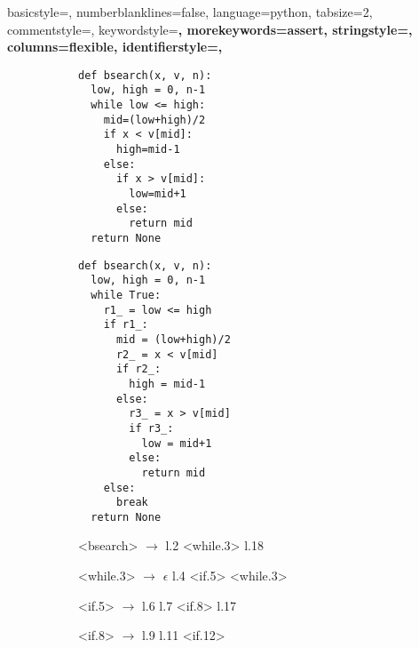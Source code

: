 {
    basicstyle=\footnotesize\ttfamily,
    numberblanklines=false,
    language=python,
    tabsize=2,
    commentstyle=\color{gray},
    keywordstyle=\bfseries\color{eclipsePurple},
    morekeywords={assert},
    stringstyle=\color{eclipseBlue},
    columns=flexible,
    identifierstyle=,
}
\begin{figure} %
\begin{subfigure}[h]{0.24\textwidth} %
\begin{lstlisting}[style=Python, escapechar=|,numbersep=2pt]
def bsearch(x, v, n):
  low, high = 0, n-1
  while low <= high:
    mid=(low+high)/2
    if x < v[mid]:
      high=mid-1
    else:
      if x > v[mid]:
        low=mid+1
      else:
        return mid
  return None
\end{lstlisting}
\vspace{60pt}
\end{subfigure}
\begin{subfigure}[h]{0.29\textwidth} %
\begin{lstlisting}[style=Python, escapechar=|,numbersep=2pt]
def bsearch(x, v, n):
  low, high = 0, n-1
  while True:
    r1_ = low <= high
    if r1_:
      mid = (low+high)/2
      r2_ = x < v[mid]
      if r2_:
        high = mid-1
      else:
        r3_ = x > v[mid]
        if r3_:
          low = mid+1
        else:
          return mid
    else:
      break
  return None
\end{lstlisting}
\end{subfigure}
\begin{subfigure}[h]{0.28\textwidth}   %
\begin{grammar}%
  <bsearch> $\rightarrow$ l.2 <while.3> l.18

  <while.3> $\rightarrow$ $\epsilon$
   \alt l.4 <if.5> <while.3>

  <if.5>    $\rightarrow$ l.6 l.7 <if.8>
   \alt l.17

  <if.8> $\rightarrow$ l.9
   \alt l.11 <if.12>


\end{grammar}
\end{subfigure}
\end{figure}
